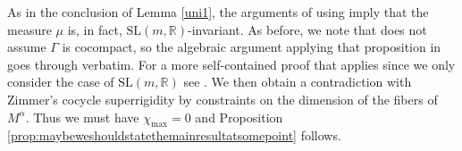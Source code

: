 \documentclass[10pt,reqno]{amsart}
\theoremstyle{Theorem}
\theoremstyle{definition}
\theoremstyle{remark}
\newcommand{\R}{\mathbb {R}}
\newcommand{\Z}{\mathbb {Z}}
\newcommand{\Sl}{\mathrm{SL}}
\def\SL{\Sl}
\begin{document}
{%
 As in the conclusion of Lemma \ref{uni1},   the arguments of \cite[Section 5.5]{BFH} using
\cite[Proposition 5.1]{AWBFRHZW-latticemeasure}  imply that the measure  $\mu$ is, in fact, $\Sl(m,\R)$-invariant. As before, we note that \cite[Proposition 5.1]{AWBFRHZW-latticemeasure} does not assume $\Gamma$ is cocompact, so the algebraic argument applying that proposition in \cite[Section 5.5]{BFH} goes through verbatim.   For a more self-contained proof that applies since we only consider the case of $\SL(m,\R)$ see \cite[Proposition 4]{BDZ}.
We then obtain a contradiction with Zimmer's cocycle superrigidity by constraints on the dimension of the fibers of $M^\alpha$.
Thus we must have $\chi_{\mathrm{max}}=0$ and Proposition \ref{prop:maybeweshouldstatethemainresultatsomepoint} follows.
%
%





}
\end{document}
